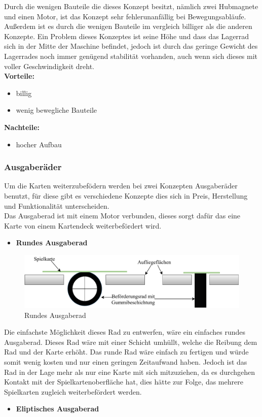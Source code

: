 Durch die wenigen Bauteile die dieses Konzept besitzt, nämlich zwei Hubmagnete und einen Motor, ist das Konzept sehr fehlerunanfällig bei Bewegungsabläufe. Außerdem ist es
durch die wenigen Bauteile im vergleich billiger als die anderen Konzepte. Ein Problem dieses Konzeptes ist seine Höhe und dass das Lagerrad sich in der Mitte der Maschine befindet,
jedoch ist durch das geringe Gewicht des Lagerrades noch immer genügend stabilität vorhanden, auch wenn sich dieses mit voller Geschwindigkeit dreht. \\

\textbf{Vorteile:}
\begin{itemize}
    \item billig
    \item wenig bewegliche Bauteile
\end{itemize}
\textbf{Nachteile:}
\begin{itemize}
    \item hocher Aufbau
\end{itemize}

 \subsubsection{Ausgaberäder}
Um die Karten weiterzubefödern werden bei zwei Konzepten Ausgaberäder benutzt, für diese gibt es verschiedene Konzepte dies sich in Preis, Herstellung und Funktionalität unterscheiden.\\
Das Ausgaberad ist mit einem Motor verbunden, dieses sorgt dafür das eine Karte von einem Kartendeck weiterbefördert wird.
\begin{itemize}
    \item \textbf{Rundes Ausgaberad}
\end{itemize}

\begin{figure}[H]
    \centering
    \includegraphics[scale=0.5,page=1]{fig/mech/RundesAusgaberad-Page-1}
    \caption{Rundes Ausgaberad}
\end{figure}

    Die einfachste Möglichkeit dieses Rad zu entwerfen, wäre ein einfaches rundes Ausgaberad. Dieses Rad wäre mit einer Schicht umhüllt, welche die Reibung
        dem Rad und der Karte erhöht. Das runde Rad wäre einfach zu fertigen und würde somit wenig kosten und nur einen geringen Zeitaufwand haben. Jedoch
        ist das Rad in der Lage mehr als nur eine Karte mit sich mitzuziehen, da es durchgehen Kontakt mit der Spielkartenoberfläche hat, dies hätte zur
        Folge, das mehrere Spielkarten zugleich weiterbefördert werden.
\begin{itemize}
    \item \textbf{Eliptisches Ausgaberad}
\end{itemize}

